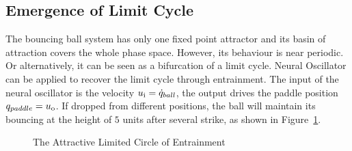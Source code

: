 \subsection*{Emergence of Limit Cycle}
The  bouncing ball system has only one fixed point attractor and its basin of attraction covers the whole phase space.
However, its behaviour is near periodic.
Or alternatively, it can be seen as a bifurcation of a limit cycle.
Neural Oscillator can be applied to recover the limit cycle through entrainment.
The input of the neural oscillator is the velocity $u_{\mathrm{i}}=\dot{q}_{ball}$, the output drives the paddle position $q_{paddle}=u_{\mathrm{o}}$.
If dropped from different positions, the ball will maintain its bouncing at the height of $5$ units after several strike,
as shown in Figure~\ref{fig:bb_attractive_circle}.

\begin{figure}[h]
\begin{center}
	
\end{center}
\caption{The Attractive Limited Circle of Entrainment}
\label{fig:bb_attractive_circle}
\end{figure}

